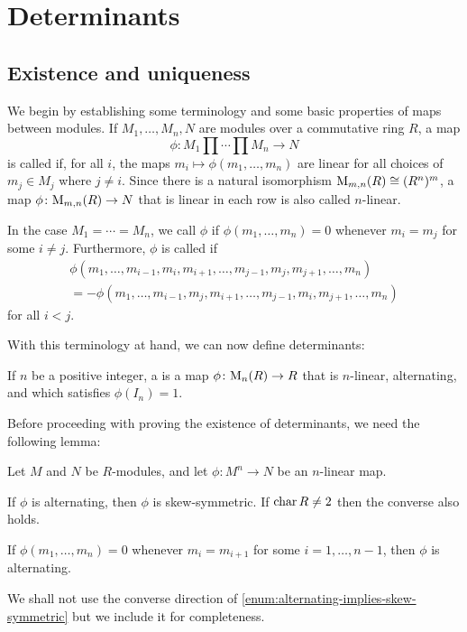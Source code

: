 \chapter{Determinants}

\section{Existence and uniqueness}\label{sec:determinant-existence-uniqueness}

We begin by establishing some terminology and some basic properties of maps between modules. If $M_1, \ldots, M_n, N$ are modules over a commutative ring $R$, a map
%
\begin{equation*}
    \phi \colon M_1 \prod \cdots \prod M_n \to N
\end{equation*}
%
is called  if, for all $i$, the maps $m_i \mapsto \phi(m_1, \ldots, m_n)$ are linear for all choices of $m_j \in M_j$ where $j \neq i$. Since there is a natural isomorphism $\mathrm{M}_{m,n}(R) \cong (R^n)^m$, a map $\phi \colon \mat{m,n}{R} \to N$ that is linear in each row is also called $n$-linear.

In the case $M_1 = \cdots = M_n$, we call $\phi$  if $\phi(m_1, \ldots, m_n) = 0$ whenever $m_i = m_j$ for some $i \neq j$. Furthermore, $\phi$ is called  if
%
\begin{multline*}
    \phi(m_1, \ldots, m_{i-1}, m_i, m_{i+1}, \ldots, m_{j-1}, m_j, m_{j+1}, \ldots, m_n) \\
        = -\phi(m_1, \ldots, m_{i-1}, m_j, m_{i+1}, \ldots, m_{j-1}, m_i, m_{j+1}, \ldots, m_n)
\end{multline*}
%
for all $i < j$.

With this terminology at hand, we can now define determinants:

\begin{definition}
    If $n$ be a positive integer, a  is a map $\phi \colon \mat{n}{R} \to R$ that is $n$-linear, alternating, and which satisfies $\phi(I_n) = 1$.
\end{definition}


Before proceeding with proving the existence of determinants, we need the following lemma:

\begin{lemma}
    Let $M$ and $N$ be $R$-modules, and let $\phi \colon M^n \to N$ be an $n$-linear map.
    \begin{enumlemma}
        \item \label{enum:alternating-implies-skew-symmetric} If $\phi$ is alternating, then $\phi$ is skew-symmetric. If $\operatorname{char} R \neq 2$ then the converse also holds.
        \item \label{enum:alternating-adjacent-rows} If $\phi(m_1, \ldots, m_n) = 0$ whenever $m_i = m_{i+1}$ for some $i = 1, \ldots, n-1$, then $\phi$ is alternating.
    \end{enumlemma}
\end{lemma}
%
We shall not use the converse direction of \cref{enum:alternating-implies-skew-symmetric} but we include it for completeness.

